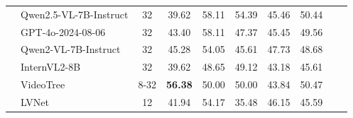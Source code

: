 \documentclass[letterpaper]{article} %
\begin{document}
\begin{table}[t]
{\begin{tabular}{clcccccccc}
                                                                     & Qwen2.5-VL-7B-Instruct \citep{bai2025qwen2}               & 32                                    & 39.62                                          & 58.11          & 54.39          & 45.46          & 50.44            \\
                                                                     & GPT-4o-2024-08-06 \citep{achiam2023gpt}                   & 32                                    & 43.40                                          & 58.11          & 47.37          & 45.45          & 49.56            \\
                                                                     & Qwen2-VL-7B-Instruct \citep{yang2024qwen2technicalreport} & 32                                    & 45.28                                          & 54.05          & 45.61          & 47.73          & 48.68            \\
                                                                     & InternVL2-8B \citep{internvl2024v2}                       & 32                                    & 39.62                                          & 48.65          & 49.12          & 43.18          & 45.61            \\
                \midrule
                                                                     & VideoTree \citep{wang2025videotree}                       & 8-32                                  & \textbf{56.38}                                 & 50.00          & 50.00          & 43.84          & 50.47            \\
                                                                     & LVNet \citep{park2024too}                                 & 12                                    & 41.94                                          & 54.17          & 35.48          & 46.15          & 45.59            \\

\end{tabular}}
\end{table}
\end{document}
